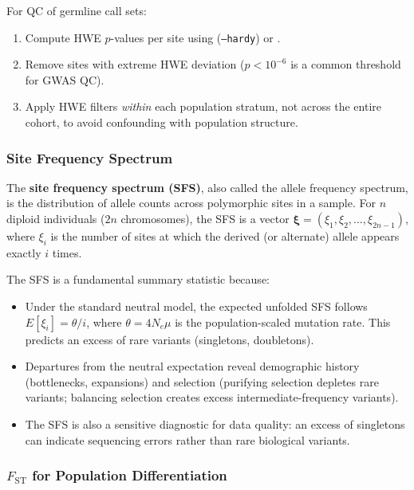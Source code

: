\begin{protocolbox}[title={Applying HWE Filters in Practice}]
For QC of germline call sets:
\begin{enumerate}[nosep]
  \item Compute HWE $p$-values per site using  (\texttt{--hardy}) or .
  \item Remove sites with extreme HWE deviation ($p < 10^{-6}$ is a common threshold for GWAS QC).
  \item Apply HWE filters \emph{within} each population stratum, not across the entire cohort, to avoid confounding with population structure.
\end{enumerate}
\end{protocolbox}

\subsubsection{Site Frequency Spectrum}

The \textbf{site frequency spectrum (SFS)}, also called the allele frequency spectrum, is the distribution of allele counts across polymorphic sites in a sample. For $n$ diploid individuals ($2n$ chromosomes), the SFS is a vector $\boldsymbol{\xi} = (\xi_1, \xi_2, \ldots, \xi_{2n-1})$, where $\xi_i$ is the number of sites at which the derived (or alternate) allele appears exactly $i$ times.

The SFS is a fundamental summary statistic because:
\begin{itemize}[nosep]
  \item Under the standard neutral model, the expected unfolded SFS follows $E[\xi_i] = \theta / i$, where $\theta = 4 N_e \mu$ is the population-scaled mutation rate. This predicts an excess of rare variants (singletons, doubletons).
  \item Departures from the neutral expectation reveal demographic history (bottlenecks, expansions) and selection (purifying selection depletes rare variants; balancing selection creates excess intermediate-frequency variants).
  \item The SFS is also a sensitive diagnostic for data quality: an excess of singletons can indicate sequencing errors rather than rare biological variants.
\end{itemize}

\subsubsection{$F_{\text{ST}}$ for Population Differentiation}

